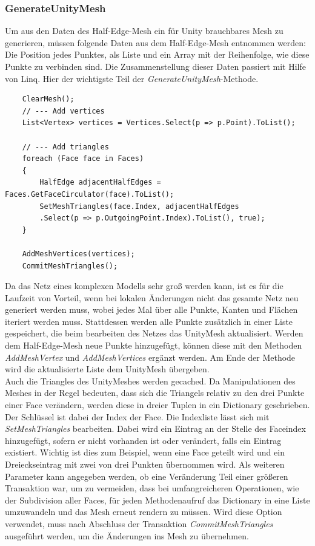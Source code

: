 \subsubsection{GenerateUnityMesh}
Um aus den Daten des Half-Edge-Mesh ein f\"ur Unity brauchbares Mesh zu generieren, m\"ussen folgende Daten aus dem Half-Edge-Mesh entnommen werden: Die Position jedes Punktes, als Liste und ein Array mit der Reihenfolge, wie diese Punkte zu verbinden sind. Die Zusammenstellung dieser Daten passiert mit Hilfe von Linq. Hier der wichtigste Teil der \textit{GenerateUnityMesh}-Methode.
\begin{lstlisting}
	ClearMesh();
	// --- Add vertices
	List<Vertex> vertices = Vertices.Select(p => p.Point).ToList();

	// --- Add triangles
	foreach (Face face in Faces)
	{
		HalfEdge adjacentHalfEdges = Faces.GetFaceCirculator(face).ToList();
		SetMeshTriangles(face.Index, adjacentHalfEdges
		.Select(p => p.OutgoingPoint.Index).ToList(), true);
	}

	AddMeshVertices(vertices);
	CommitMeshTriangles();
\end{lstlisting}
Da das Netz eines komplexen Modells sehr gro{\ss} werden kann, ist es f\"ur die Laufzeit von Vorteil, wenn bei lokalen \"Anderungen nicht das gesamte Netz neu generiert werden muss, wobei jedes Mal \"uber alle Punkte, Kanten und Fl\"achen iteriert werden muss. Stattdessen werden alle Punkte zus\"atzlich in einer Liste gespeichert, die beim bearbeiten des Netzes das UnityMesh aktualisiert. Werden dem Half-Edge-Mesh neue Punkte hinzugef\"ugt, k\"onnen diese mit den Methoden \textit{AddMeshVertex} und \textit{AddMeshVertices} erg\"anzt werden. Am Ende der Methode wird die aktualisierte Liste dem UnityMesh \"ubergeben. 
\\
Auch die Triangles des UnityMeshes werden gecached. Da Manipulationen des Meshes in der Regel bedeuten, dass sich die Triangels relativ zu den drei Punkte einer Face ver\"andern, werden diese in dreier Tuplen in ein Dictionary geschrieben. Der Schl\"ussel ist dabei der Index der Face. Die Indexliste l\"asst sich mit \textit{SetMeshTriangles} bearbeiten. Dabei wird ein Eintrag an der Stelle des Faceindex hinzugef\"ugt, sofern er nicht vorhanden ist oder ver\"andert, falls ein Eintrag existiert. Wichtig ist dies zum Beispiel, wenn eine Face geteilt wird und ein Dreieckseintrag mit zwei von drei Punkten \"ubernommen wird. Als weiteren Parameter kann angegeben werden, ob eine Ver\"anderung Teil einer gr\"o{\ss}eren Transaktion war, um zu vermeiden, dass bei umfangreicheren Operationen, wie der Subdivision aller Faces, f\"ur jeden Methodenaufruf das Dictionary in eine Liste umzuwandeln und das Mesh erneut rendern zu m\"ussen. Wird diese Option verwendet, muss nach Abschluss der Transaktion \textit{CommitMeshTriangles} ausgef\"uhrt werden, um die \"Anderungen ins Mesh zu \"ubernehmen.

